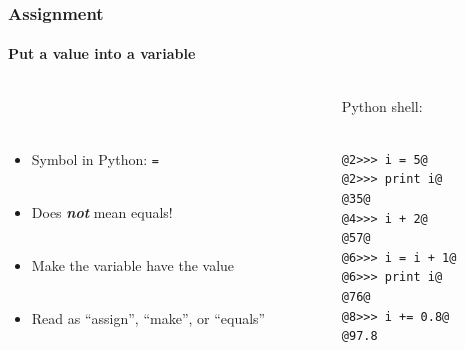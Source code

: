\documentclass[handout]{beamer}
\begin{document}
\begin{frame}[fragile]
\frametitle{Assignment}
\framesubtitle{Put a value into a variable}
\large
  \begin{columns}[T]
    \begin{column}{.5\textwidth} 
\ \\ 

\ \\ 


\begin{itemize}


\item<1-> Symbol in Python: \texttt{=}\\ \
 \item<1-> Does \textbf{\textit{\alert{not}}} mean equals!\\ \
 \item<2->  Make the variable have the value \\ \

 \item<2-> Read as ``assign'', ``make'', or ``equals'' \\ \


\end{itemize}
     \end{column}
     
         \begin{column}{.5\textwidth} 
         Python shell: \\ \
\begin{lstlisting}[style=base]
@2>>> i = 5@
@2>>> print i@
@35@
@4>>> i + 2@
@57@
@6>>> i = i + 1@
@6>>> print i@
@76@
@8>>> i += 0.8@
@97.8
\end{lstlisting}

    \end{column}
    \end{columns}

\end{frame}
\end{document}
